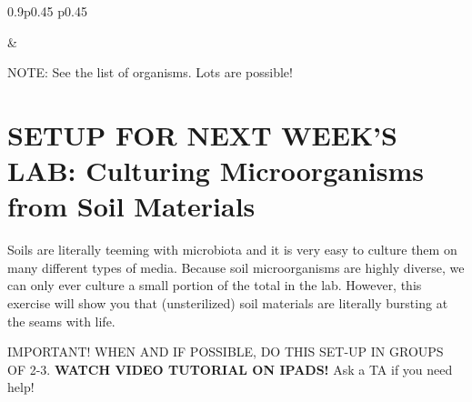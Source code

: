 \documentclass[
  letterpaper,
  twocolumn,
  portrait]{scrbook}
\begin{document}
\begin{table}[h!]
\begin{centerbox}
\begin{threeparttable}
\begin{tabularx}{0.9\textwidth}{p{} p{}}

 &
 \tabularnewline[-0.5pt]


\end{tabularx}
\end{threeparttable}\par\end{centerbox}

\end{table}
 

NOTE: See the list of organisms. Lots are possible!

\hypertarget{setup-for-next-weeks-lab-culturing-microorganisms-from-soil-materials}{%
\section{SETUP FOR NEXT WEEK'S LAB: Culturing Microorganisms from Soil
Materials}\label{setup-for-next-weeks-lab-culturing-microorganisms-from-soil-materials}}

Soils are literally teeming with microbiota and it is very easy to
culture them on many different types of media. Because soil
microorganisms are highly diverse, we can only ever culture a small
portion of the total in the lab. However, this exercise will show you
that (unsterilized) soil materials are literally bursting at the seams
with life.

IMPORTANT! WHEN AND IF POSSIBLE, DO THIS SET-UP IN GROUPS OF 2-3.
\textbf{WATCH VIDEO TUTORIAL ON IPADS!} Ask a TA if you need help!
\end{document}
